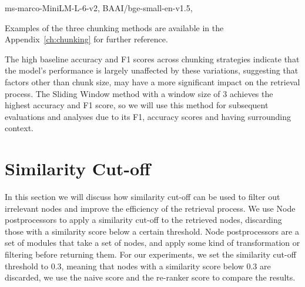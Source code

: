 \begin{table}[h!]
    \centering
    \noindent
    {\scriptsize ms-marco-MiniLM-L-6-v2, BAAI/bge-small-en-v1.5,}\\
    \caption{Evaluation Results for Different Chunking Strategies through the Pipeline (just with the Gemma2 model)}
    \label{tab:table_chunking}
\end{table}
Examples of the three chunking methods are available in the Appendix~\ref{ch:chunking} for further reference.

The high baseline accuracy and F1 scores across chunking strategies indicate that the model’s performance is largely unaffected by these variations, suggesting that factors other than chunk size, may have a more significant impact on the retrieval process.
The Sliding Window method with a window size of 3 achieves the highest accuracy and F1 score, so we will use this method for subsequent evaluations and analyses due to its F1, accuracy scores and having surrounding context.

\section{Similarity Cut-off}\label{sec:similar-cut-off}
In this section we will discuss how similarity cut-off can be used to filter out irrelevant nodes and improve the efficiency of the retrieval process.
We use Node postprocessors to apply a similarity cut-off to the retrieved nodes, discarding those with a similarity score below a certain threshold.
Node postprocessors are a set of modules that take a set of nodes, and apply some kind of transformation or filtering before returning them.
For our experiments, we set the similarity cut-off threshold to 0.3, meaning that nodes with a similarity score below 0.3 are discarded, we use the naive score and the re-ranker score to compare the results.

